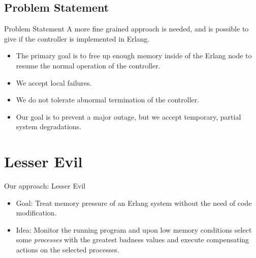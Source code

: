 \documentclass{beamer}
\begin{document}
\subsection{Problem Statement}
\begin{frame}{Problem Statement}
A more fine grained approach is needed, and is possible to give if the controller is implemented in Erlang.

\begin{itemize}
	\item The primary goal is to free up enough memory inside of the Erlang node to resume the normal operation of the controller.
	\item We accept local failures.
	\item We do not tolerate abnormal termination of the controller.
	\item Our goal is to prevent a major outage, but we accept temporary, partial system degradations.
\end{itemize}
\end{frame}

\section{Lesser Evil}
\begin{frame}{Our approach: Lesser Evil}
\begin{itemize}

\item Goal: Treat memory pressure of an Erlang system without the need of code modification. 

\item Idea: Monitor the running program and upon low memory conditions select some \emph{processes} with the greatest badness values and execute compensating actions on the selected processes. 
\end{itemize}
\end{frame}



\end{document}
